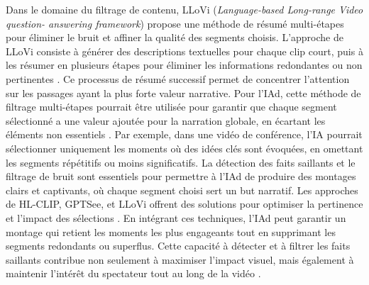 \documentclass[livre]{udes-genie-these}
\begin{document}
Dans le domaine du filtrage de contenu, LLoVi (\textit{Language-based Long-range Video question- answering framework}) propose une méthode de résumé multi-étapes pour éliminer le bruit et affiner la qualité des segments choisis. L'approche de LLoVi consiste à générer des descriptions textuelles pour chaque clip court, puis à les résumer en plusieurs étapes pour éliminer les informations redondantes ou non pertinentes \cite{anonymous2023_valley}\cite{zhang2019_memory}. Ce processus de résumé successif permet de concentrer l'attention sur les passages ayant la plus forte valeur narrative.
Pour l'IAd, cette méthode de filtrage multi-étapes pourrait être utilisée pour garantir que chaque segment sélectionné a une valeur ajoutée pour la narration globale, en écartant les éléments non essentiels \cite{zhang2019_memory}\cite{han2024_clip}. Par exemple, dans une vidéo de conférence, l'IA pourrait sélectionner uniquement les moments où des idées clés sont évoquées, en omettant les segments répétitifs ou moins significatifs.
La détection des faits saillants et le filtrage de bruit sont essentiels pour permettre à l'IAd de produire des montages clairs et captivants, où chaque segment choisi sert un but narratif. Les approches de HL-CLIP, GPTSee, et LLoVi offrent des solutions pour optimiser la pertinence et l'impact des sélections \cite{sun2023_gptsee}\cite{han2024_clip}\cite{zhang2019_memory}.
En intégrant ces techniques, l'IAd peut garantir un montage qui retient les moments les plus engageants tout en supprimant les segments redondants ou superflus. Cette capacité à détecter et à filtrer les faits saillants contribue non seulement à maximiser l'impact visuel, mais également à maintenir l'intérêt du spectateur tout au long de la vidéo \cite{sun2023_gptsee}\cite{anonymous2023_valley}.
\end{document}
